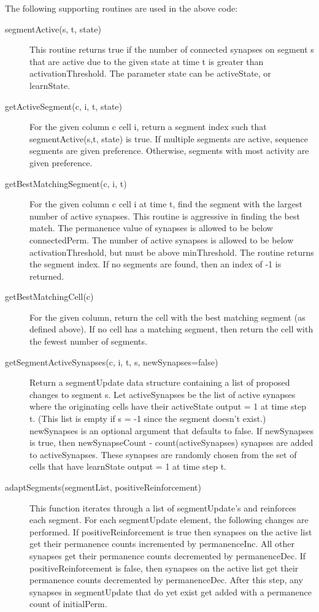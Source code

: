 The following supporting routines are used in the above code:

\begin{description}
\item[segmentActive(s, t, state)] This routine returns true if the
  number of connected synapses on segment s that are active due to the
  given state at time t is greater than activationThreshold. The
  parameter state can be activeState, or learnState.
\item[getActiveSegment(c, i, t, state)] For the given column c cell i,
  return a segment index such that segmentActive(s,t, state) is
  true. If multiple segments are active, sequence segments are given
  preference. Otherwise, segments with most activity are given
  preference.
\item[getBestMatchingSegment(c, i, t)] For the given column c cell i
  at time t, find the segment with the largest number of active
  synapses. This routine is aggressive in finding the best match. The
  permanence value of synapses is allowed to be below
  connectedPerm. The number of active synapses is allowed to be below
  activationThreshold, but must be above minThreshold. The routine
  returns the segment index. If no segments are found, then an index
  of -1 is returned.
\item[getBestMatchingCell(c)] For the given column, return the cell
  with the best matching segment (as defined above). If no cell has a
  matching segment, then return the cell with the fewest number of
  segments.
\item[getSegmentActiveSynapses(c, i, t, s, newSynapses=false)] Return
  a segmentUpdate data structure containing a list of proposed changes
  to segment s. Let activeSynapses be the list of active synapses
  where the originating cells have their activeState output = 1 at
  time step t. (This list is empty if s = -1 since the segment doesn't
  exist.) newSynapses is an optional argument that defaults to
  false. If newSynapses is true, then newSynapseCount -
  count(activeSynapses) synapses are added to activeSynapses. These
  synapses are randomly chosen from the set of cells that have
  learnState output = 1 at time step t.
\item[adaptSegments(segmentList, positiveReinforcement)] This function
  iterates through a list of segmentUpdate's and reinforces each
  segment. For each segmentUpdate element, the following changes are
  performed. If positiveReinforcement is true then synapses on the
  active list get their permanence counts incremented by
  permanenceInc. All other synapses get their permanence counts
  decremented by permanenceDec. If positiveReinforcement is false,
  then synapses on the active list get their permanence counts
  decremented by permanenceDec. After this step, any synapses in
  segmentUpdate that do yet exist get added with a permanence count of
  initialPerm.
\end{description}

